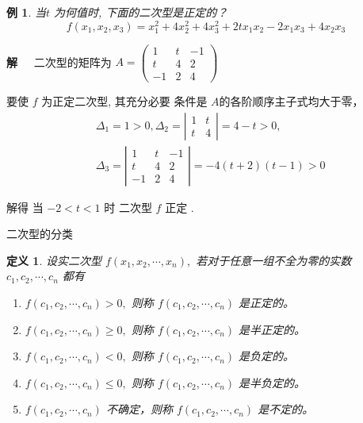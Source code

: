 \documentclass[13pt]{beamer}
\newtheorem{exa}{例}
\newtheorem*{defi}{定义}
\def\pf{{\bf 证明~~ }}
\def\sol{{\bf 解~~ }}
\begin{document}
\begin{frame}
\begin{exa}
当$t$ 为何值时, 下面的二次型是正定的？ $$f\left(x_{1}, x_{2}, x_{3}\right)=x_{1}^{2}+4 x_{2}^{2}+4 x_{3}^{2}+2 t x_{1} x_{2}-2 x_{1} x_{3}+4 x_{2} x_{3}$$

\end{exa}
\sol
二次型的矩阵为 
$A=\left(\begin{array}{rrr}1 & t & -1 \\ t & 4 & 2 \\ -1 & 2 & 4\end{array}\right)$

要使 $f$ 为正定二次型, 其充分必要
条件是 $A$的各阶顺序主子式均大于零，
\begin{align*}
& \Delta_{1}=1>0, \Delta_{2}=\left|\begin{array}{cc}
1 & t \\
t & 4
\end{array}\right|=4-t>0, \\
&
\Delta_{3}=\left|\begin{array}{ccc}
1 & t & -1 \\
t & 4 & 2 \\
-1 & 2 & 4
\end{array}\right| =- 4( t + 2) ( t - 1) > 0
\end{align*}



 解得 当 $-2<t<1$ 时
二次型 $f$ 正定 .
\end{frame}

\begin{frame}{二次型的分类}
\begin{defi}
设实二次型 $f\left(x_{1}, x_{2}, \cdots, x_{n}\right),$ 若对于任意一组不全为零的实数
$c_{1}, c_{2}, \cdots, c_{n}$ 都有
\begin{enumerate}
\item $f\left(c_{1}, c_{2}, \cdots, c_{n}\right)>0,$ 则称 $f\left(c_{1}, c_{2}, \cdots, c_{n}\right)$ 是正定的。
\item $f\left(c_{1}, c_{2}, \cdots, c_{n}\right) \geq 0,$ 则称 $f\left(c_{1}, c_{2}, \cdots, c_{n}\right)$ 是半正定的。
\item $f\left(c_{1}, c_{2}, \cdots, c_{n}\right)<0,$ 则称 $f\left(c_{1}, c_{2}, \cdots, c_{n}\right)$ 是负定的。
\item $f\left(c_{1}, c_{2}, \cdots, c_{n}\right) \leq 0,$ 则称 $f\left(c_{1}, c_{2}, \cdots, c_{n}\right)$ 是半负定的。
\item $f\left(c_{1}, c_{2}, \cdots, c_{n}\right)$ 不确定，则称 $f\left(c_{1}, c_{2}, \cdots, c_{n}\right)$ 是不定的。
\end{enumerate}
\end{defi}
\end{frame}
\end{document}
